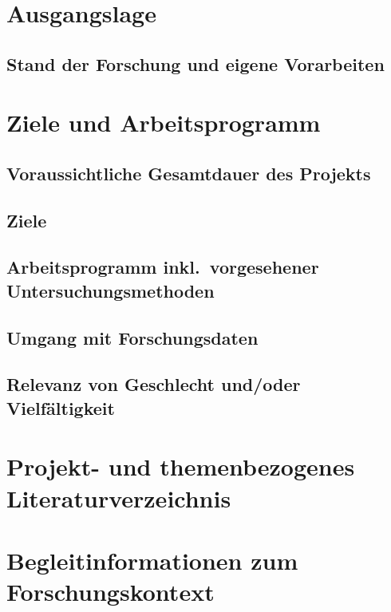 \documentclass[german, 53.01]{proposal}
\begin{document}
\section{Ausgangslage}

\subsection*{Stand der Forschung und eigene Vorarbeiten}


\section{Ziele und Arbeitsprogramm}

\subsection{Voraussichtliche Gesamtdauer des Projekts}

\subsection{Ziele}

\subsection{Arbeitsprogramm inkl.\ vorgesehener Untersuchungsmethoden}

\subsection{Umgang mit Forschungsdaten}

\subsection{Relevanz von Geschlecht und/oder Vielfältigkeit}


\section{Projekt- und themenbezogenes Literaturverzeichnis}

\printbibliography[heading=none]

\clearpage
\renewcommand{\maxpage}{8}
\setcounter{page}{1}

\section{Begleitinformationen zum Forschungskontext}
\end{document}
